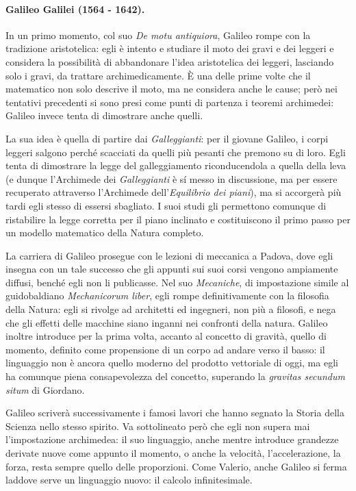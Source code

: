\paragraph{Galileo Galilei (1564 - 1642).} In un primo momento, col suo \textit{De motu antiquiora}, Galileo rompe con la tradizione aristotelica: egli \`e intento e studiare il moto dei gravi e dei leggeri e considera la possibilit\`a di abbandonare l'idea aristotelica dei leggeri, lasciando solo i gravi, da trattare archimedicamente. \`E una delle prime volte che il matematico non solo descrive il moto, ma ne considera anche le cause; per\`o nei tentativi precedenti si sono presi come punti di partenza i teoremi archimedei: Galileo invece tenta di dimostrare anche quelli.
\par La sua idea \`e quella di partire dai \textit{Galleggianti}: per il giovane Galileo, i corpi leggeri salgono perch\'e scacciati da quelli pi\`u pesanti che premono su di loro. Egli tenta di dimostrare la legge del galleggiamento riconducendola a quella della leva (e dunque l'Archimede dei \textit{Galleggianti} \`e s\'i messo in discussione, ma per essere recuperato attraverso l'Archimede dell'\textit{Equilibrio dei piani}), ma si accorger\`a pi\`u tardi egli stesso di essersi sbagliato. I suoi studi gli permettono comunque di ristabilire la legge corretta per il piano inclinato e costituiscono il primo passo per un modello matematico della Natura completo.
\par La carriera di Galileo prosegue con le lezioni di meccanica a Padova, dove egli insegna con un tale successo che gli appunti sui suoi corsi vengono ampiamente diffusi, bench\'e egli non li publicasse. Nel suo \textit{Mecaniche}, di impostazione simile al guidobaldiano \textit{Mechanicorum liber}, egli rompe definitivamente con la filosofia della Natura: egli si rivolge ad architetti ed ingegneri, non pi\`u a filosofi, e nega che gli effetti delle macchine siano inganni nei confronti della natura. Galileo inoltre introduce per la prima volta, accanto al concetto di gravit\`a, quello di momento, definito come propensione di un corpo ad andare verso il basso: il linguaggio non \`e ancora quello moderno del prodotto vettoriale di oggi, ma egli ha comunque piena consapevolezza del concetto, superando la \textit{gravitas secundum situm} di Giordano.
\par Galileo scriver\`a successivamente i famosi lavori che hanno segnato la Storia della Scienza nello stesso spirito. Va sottolineato per\`o che egli non supera mai l'impostazione archimedea: il suo linguaggio, anche mentre introduce grandezze derivate nuove come appunto il momento, o anche la velocit\`a, l'accelerazione, la forza, resta sempre quello delle proporzioni. Come Valerio, anche Galileo si ferma laddove serve un linguaggio nuovo: il calcolo infinitesimale.
